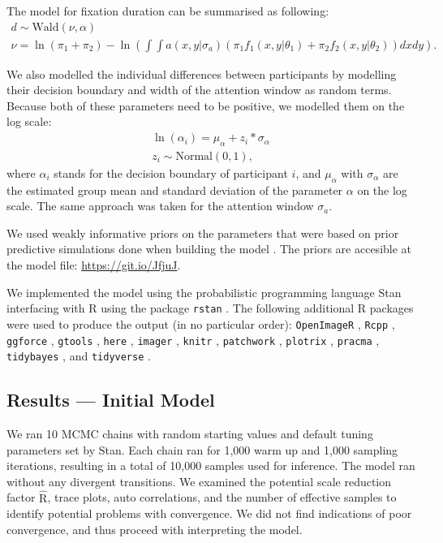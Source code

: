\documentclass{article}
\begin{document}
The model for fixation duration can be summarised as following:
\begin{gather*}
    d \sim \text{Wald}(\nu, \alpha) \\
    \nu = \ln(\pi_1 + \pi_2) - \ln\left(\int\int a(x, y | \sigma_a) \left(\pi_1 f_1(x, y | \theta_1) + \pi_2 f_2(x, y | \theta_2)\right)dxdy\right).
\end{gather*}

We also modelled the individual differences between participants by modelling their decision boundary and width of the attention window as random terms. Because both of these parameters need to be positive, we modelled them on the log scale:
\begin{gather*}
    \ln (\alpha_i)  = \mu_{\alpha} + z_i * \sigma_{\alpha} \\
    z_i  \sim \text{Normal}(0, 1),
\end{gather*}
where $\alpha_i$ stands for the decision boundary of participant $i$, and $\mu_{\alpha}$ with $\sigma_{\alpha}$ are the estimated group mean and standard deviation of the parameter $\alpha$ on the log scale. The same approach was taken for the attention window $\sigma_a$.

We used weakly informative priors on the parameters that were based on prior predictive simulations done when building the model \citep{schad2019principled}. The priors are accesible at the model file: \url{https://git.io/JfjuJ}.

We implemented the model using the probabilistic programming language Stan \citep{carpenter2017stan} interfacing with R \citep{citeR} using the package \texttt{rstan} \citep{team2020rstan,R-rstan}. The following additional R packages were used to produce the output (in no particular order): \texttt{OpenImageR} \citep{R-OpenImageR}, \texttt{Rcpp} \citep{R-Rcpp,Rcpp2017}, \texttt{ggforce} \citep{R-ggforce}, \texttt{gtools} \citep{R-gtools}, \texttt{here} \citep{R-here}, \texttt{imager} \citep{R-imager}, \texttt{knitr} \citep{R-knitr,knitr2015}, \texttt{patchwork} \citep{R-patchwork}, \texttt{plotrix} \citep{R-plotrix}, \texttt{pracma} \citep{R-pracma}, \texttt{tidybayes} \citep{R-tidybayes}, and \texttt{tidyverse} \citep{R-tidyverse,tidyverse2019}.

\subsection{Results --- Initial Model}

We ran 10 MCMC chains with random starting values and default tuning parameters set by Stan. Each chain ran for 1,000 warm up and 1,000 sampling iterations, resulting in a total of 10,000 samples used for inference.
The model ran without any divergent transitions. We examined the potential scale reduction factor $\hat{\text{R}}$, trace plots, auto correlations, and the number of effective samples to identify potential problems with convergence. We did not find indications of poor convergence, and thus proceed with interpreting the model.
\end{document}
